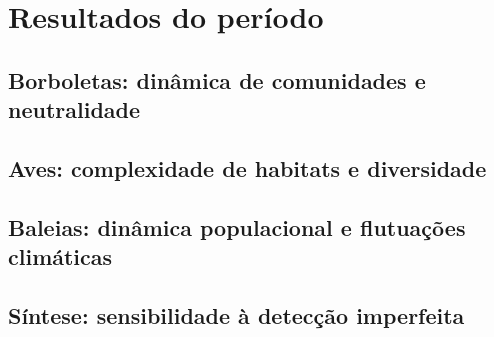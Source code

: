 \section{Resultados do período}


\subsection{Borboletas: dinâmica de comunidades e neutralidade} %
\label{sec:dinamica-temporal-borb} 

\subsection{Aves: complexidade de habitats e diversidade} %
\label{sec:compl-de-habit} 

\subsection{Baleias: dinâmica populacional e flutuações climáticas} %
\label{sec:dinam-popul-de} 

\subsection{Síntese: sensibilidade à detecção imperfeita} %
